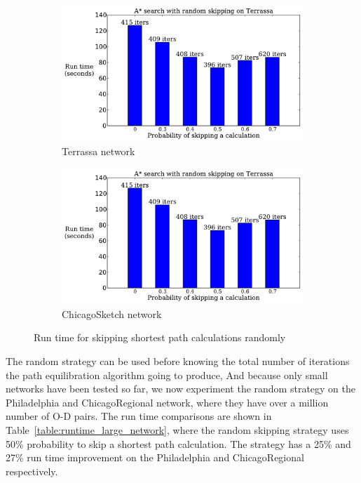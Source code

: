 \begin{figure}[H]
    \centering
    \begin{subfigure}{.5\textwidth}
        \centering
        \includegraphics[page=1,width=\textwidth]{img/random_time}
        \caption{Terrassa network}
        \label{fig:terrassa_random_n}
    \end{subfigure}%
    \begin{subfigure}{.5\textwidth}
        \centering
        \includegraphics[page=2,width=\textwidth]{img/random_time}
        \caption{ChicagoSketch network}
        \label{fig:chicago_random_n}
    \end{subfigure}
    \caption{Run time for skipping shortest path calculations randomly}
    \label{fig:random_n}
\end{figure}

The random strategy can be used before knowing the total number of iterations the path equilibration algorithm going to produce,
And because only small networks have been tested so far,
we now experiment the random strategy on the Philadelphia and ChicagoRegional network, where they have over a million number of O-D pairs.
The run time comparisons are shown in Table~\ref{table:runtime_large_network},
where the random skipping strategy uses 50\% probability to skip a shortest path calculation.
The strategy has a 25\% and 27\% run time improvement on the Philadelphia and ChicagoRegional respectively.

